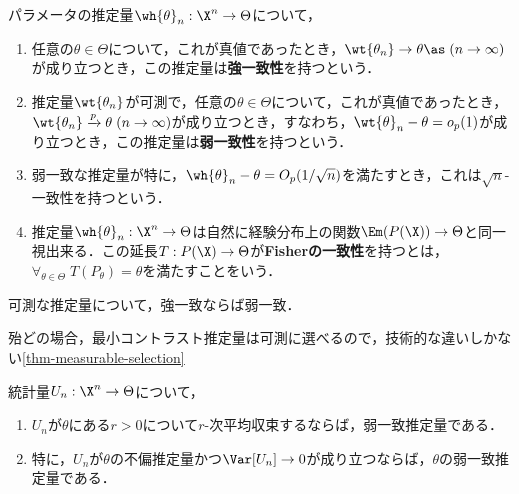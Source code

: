 \documentclass[uplatex,dvipdfmx]{jsreport}
\begin{document}
\begin{definition}[consistency]
    パラメータの推定量$\wh{\theta}_n:\X^n\to\Theta$について，
    \begin{enumerate}
        \item 任意の$\theta\in\Theta$について，これが真値であったとき，$\wt{\theta_n}\to\theta\as\;(n\to\infty)$が成り立つとき，この推定量は\textbf{強一致性}を持つという．
        \item 推定量$\wt{\theta_n}$が可測で，任意の$\theta\in\Theta$について，これが真値であったとき，$\wt{\theta_n}\xrightarrow{p}\theta\;(n\to\infty)$が成り立つとき，すなわち，$\wt{\theta}_n-\theta=o_p(1)$が成り立つとき，この推定量は\textbf{弱一致性}を持つという．
        \item 弱一致な推定量が特に，$\wh{\theta}_n-\theta=O_p(1/\sqrt{n})$を満たすとき，これは$\sqrt{n}$-一致性を持つという．
        \item 推定量$\wh{\theta}_n:\X^n\to\Theta$は自然に経験分布上の関数$\Em(P(\X))\to\Theta$と同一視出来る．この延長$T:P(\X)\to\Theta$が\textbf{Fisherの一致性}を持つとは，$\forall_{\theta\in\Theta}\;T(P_\theta)=\theta$を満たすことをいう．
    \end{enumerate}
    可測な推定量について，強一致ならば弱一致．
\end{definition}
\begin{remarks}
    殆どの場合，最小コントラスト推定量は可測に選べるので，技術的な違いしかない\ref{thm-measurable-selection}
\end{remarks}

\begin{lemma}[分散が消える不偏推定量は一致推定量である]
    統計量$U_n:\X^n\to\Theta$について，
    \begin{enumerate}
        \item $U_n$が$\theta$にある$r>0$について$r$-次平均収束するならば，弱一致推定量である．
        \item 特に，$U_n$が$\theta$の不偏推定量かつ$\Var[U_n]\to0$が成り立つならば，$\theta$の弱一致推定量である．
    \end{enumerate}
\end{lemma}
\end{document}
